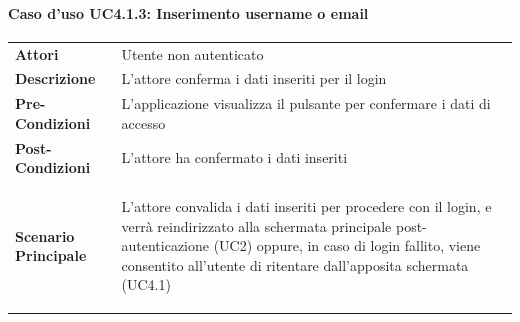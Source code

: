 \paragraph{Caso d'uso UC4.1.3:  Inserimento username o email}
\label{UC4_1_3}

\begin{minipage}{\linewidth}
\begin{longtable}{ l | p{11cm}}
	\hline
	\rowcolor{Gray}
	\multicolumn{2}{c}{Caso d'uso UC4.1.3:  Inserimento username o email} \\
	\hline
	\textbf{Attori} & Utente non autenticato \\
	\textbf{Descrizione} & L'attore conferma i dati inseriti per il login  \\
	\textbf{Pre-Condizioni} & L'applicazione visualizza il pulsante per confermare i dati di accesso \\
	\textbf{Post-Condizioni} & L'attore ha confermato i dati inseriti \\
	\textbf{Scenario Principale} & \begin{enumerate*}[label=(\arabic*.),itemjoin={\newline}]
	\item L'attore convalida i dati inseriti per procedere con il login, e verrà reindirizzato alla schermata principale post-autenticazione (UC2) oppure, in caso di login fallito, viene consentito all'utente di ritentare dall'apposita schermata (UC4.1)
\end{enumerate*}\\
\end{longtable}
\end{minipage}